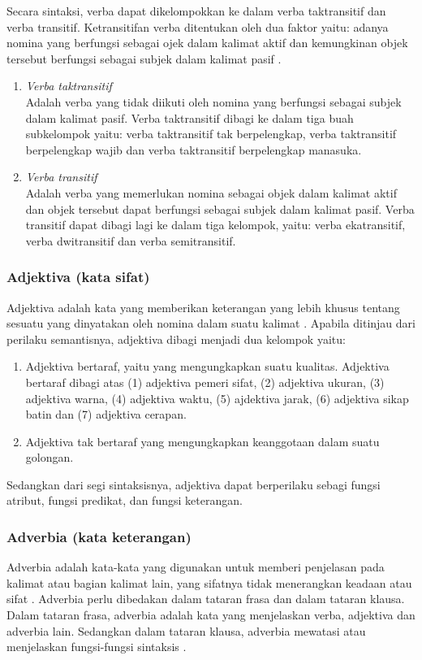 Secara sintaksi, verba dapat dikelompokkan ke dalam verba taktransitif dan verba transitif. Ketransitifan verba ditentukan oleh dua faktor yaitu: adanya nomina yang berfungsi sebagai ojek dalam kalimat aktif dan kemungkinan objek tersebut berfungsi sebagai subjek dalam kalimat pasif \citep{alwi}.
\begin{enumerate}
	\item \emph{Verba taktransitif}\\
	Adalah verba yang tidak diikuti oleh nomina yang berfungsi sebagai subjek dalam kalimat pasif. Verba taktransitif dibagi ke dalam tiga buah subkelompok yaitu: verba taktransitif tak berpelengkap, verba taktransitif berpelengkap wajib dan verba taktransitif berpelengkap manasuka.
	\item \emph{Verba transitif}\\
	Adalah verba yang memerlukan nomina sebagai objek dalam kalimat aktif dan objek tersebut dapat berfungsi sebagai subjek dalam kalimat pasif. Verba transitif dapat dibagi lagi ke dalam tiga kelompok, yaitu: verba ekatransitif, verba dwitransitif dan verba semitransitif.
\end{enumerate}

\subsubsection{Adjektiva (kata sifat)}
Adjektiva adalah kata yang memberikan keterangan yang lebih khusus tentang sesuatu yang  dinyatakan oleh nomina dalam suatu kalimat \citep{alwi}. Apabila ditinjau dari perilaku semantisnya, adjektiva dibagi menjadi dua kelompok yaitu:
\begin{enumerate}
	\item Adjektiva bertaraf, yaitu yang mengungkapkan suatu kualitas. Adjektiva bertaraf dibagi atas (1) adjektiva pemeri sifat, (2) adjektiva ukuran, (3) adjektiva warna, (4) adjektiva waktu, (5) ajdektiva jarak, (6) adjektiva sikap batin dan (7) adjektiva cerapan.
	\item Adjektiva tak bertaraf yang mengungkapkan keanggotaan dalam suatu golongan.
\end{enumerate}
Sedangkan dari segi sintaksisnya, adjektiva dapat berperilaku sebagi fungsi atribut, fungsi predikat, dan fungsi keterangan.

\subsubsection{Adverbia (kata keterangan)}
Adverbia adalah kata-kata yang digunakan untuk memberi penjelasan pada kalimat atau bagian kalimat lain, yang sifatnya tidak menerangkan keadaan atau sifat \citep{chaer}. Adverbia perlu dibedakan dalam tataran frasa dan dalam tataran klausa. Dalam tataran frasa, adverbia adalah kata yang menjelaskan verba, adjektiva dan adverbia lain. Sedangkan dalam tataran klausa, adverbia mewatasi atau menjelaskan fungsi-fungsi sintaksis \citep{alwi}.

